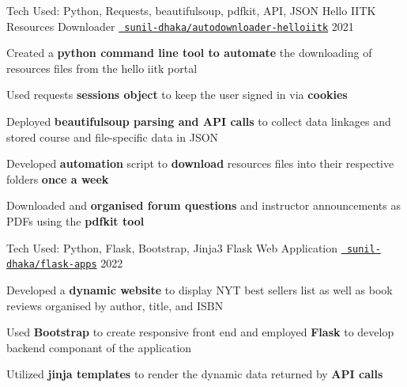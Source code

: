 
\begin{cventries}
  \cventry
  {Tech Used: Python, Requests, beautifulsoup, pdfkit, API, JSON}
  {Hello IITK Resources Downloader}
  {\texttt{\href{https://github.com/sunil-dhaka/autodownloader-helloiitk}{\faGithub{} sunil-dhaka/autodownloader-helloiitk}}}
  {2021}
  {
    \begin{cvitems}
      \item Created a \textbf{python command line tool to automate} the downloading of resources files from the hello iitk portal 
      \item Used requests \textbf{sessions object} to keep the user signed in via \textbf{cookies}
      \item Deployed \textbf{beautifulsoup parsing and API calls} to collect data linkages and stored course and file-specific data in JSON
      \item Developed \textbf{automation} script to \textbf{download} resources files into their respective folders \textbf{once a week}
      \item Downloaded and \textbf{organised forum questions} and instructor announcements as PDFs using the \textbf{pdfkit tool}
    \end{cvitems}
  }
  
  \cventry
  {Tech Used: Python, Flask, Bootstrap, Jinja3}
  {Flask Web Application  \href{https://www.youtube.com/watch?v=JlubCZitXRE}{\faYoutubePlay{}}}
  {\texttt{\href{https://github.com/sunil-dhaka/flask-apps}{\faGithub{} sunil-dhaka/flask-apps}}}
  {2022}
  {
    \begin{cvitems}
    \item Developed a \textbf{dynamic website} to display NYT best sellers list as well as book reviews organised by author, title, and ISBN%
    \item Used \textbf{Bootstrap} to create responsive front end and employed \textbf{Flask} to develop backend componant of the application
    \item Utilized \textbf{jinja templates} to render the dynamic data returned by \textbf{API calls}
    \end{cvitems}
  }
\end{cventries}
\vspace{-2mm}
